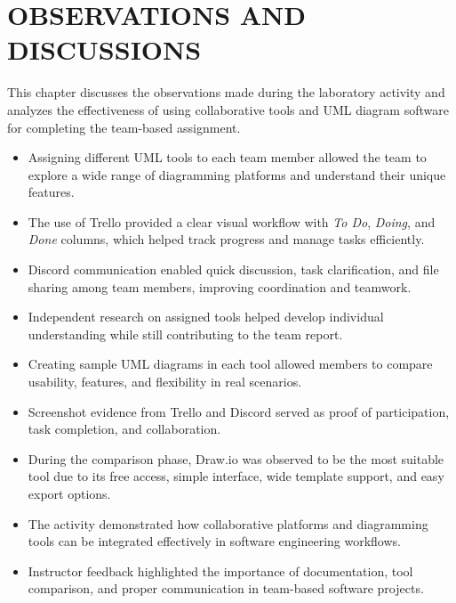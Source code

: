 \chapter{OBSERVATIONS AND DISCUSSIONS}
\label{ch:observations}

This chapter discusses the observations made during the laboratory activity and analyzes the effectiveness of using collaborative tools and UML diagram software for completing the team-based assignment.

\begin{itemize}
  \item Assigning different UML tools to each team member allowed the team to explore a wide range of diagramming platforms and understand their unique features.
  
  \item The use of Trello provided a clear visual workflow with \textit{To Do}, \textit{Doing}, and \textit{Done} columns, which helped track progress and manage tasks efficiently.
  
  \item Discord communication enabled quick discussion, task clarification, and file sharing among team members, improving coordination and teamwork.
  
  \item Independent research on assigned tools helped develop individual understanding while still contributing to the team report.
  
  \item Creating sample UML diagrams in each tool allowed members to compare usability, features, and flexibility in real scenarios.
  
  \item Screenshot evidence from Trello and Discord served as proof of participation, task completion, and collaboration.
  
  \item During the comparison phase, Draw.io was observed to be the most suitable tool due to its free access, simple interface, wide template support, and easy export options.
  
  \item The activity demonstrated how collaborative platforms and diagramming tools can be integrated effectively in software engineering workflows.
  
  \item Instructor feedback highlighted the importance of documentation, tool comparison, and proper communication in team-based software projects.
\end{itemize}
